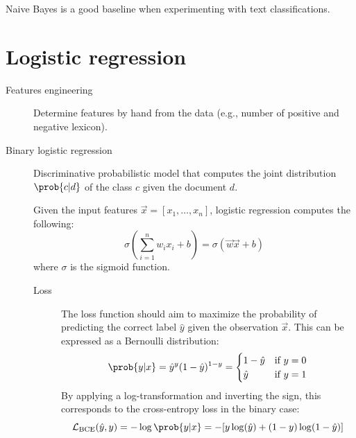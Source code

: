 \begin{remark}
    Naive Bayes is a good baseline when experimenting with text classifications.
\end{remark}



\section{Logistic regression}

\begin{description}
    \item[Features engineering] 
        Determine features by hand from the data (e.g., number of positive and negative lexicon).


    \item[Binary logistic regression] 
        Discriminative probabilistic model that computes the joint distribution $\prob{c | d}$ of the class $c$ given the document $d$.

        Given the input features $\vec{x} = [x_1, \dots, x_n]$, logistic regression computes the following:
        \[ 
            \sigma\left( \sum_{i=1}^{n} w_i x_i + b \right) = \sigma(\vec{w}\vec{x} + b)
        \]
        where $\sigma$ is the sigmoid function.

        \begin{description}
            \item[Loss]
                The loss function should aim to maximize the probability of predicting the correct label $\hat{y}$ given the observation $\vec{x}$. This can be expressed as a Bernoulli distribution:
                \[ 
                    \prob{y | x} = \hat{y}^y (1-\hat{y})^{1-y} = \begin{cases}
                        1 - \hat{y} & \text{if $y=0$} \\
                        \hat{y} & \text{if $y=1$} \\
                    \end{cases} 
                \]
                By applying a log-transformation and inverting the sign, this corresponds to the cross-entropy loss in the binary case:
                \[ \mathcal{L}_{\text{BCE}}(\hat{y}, y) = -\log \prob{y | x} = -[y \log(\hat{y}) + (1-y)\log(1-\hat{y})] \]


\end{description}
\end{description}
